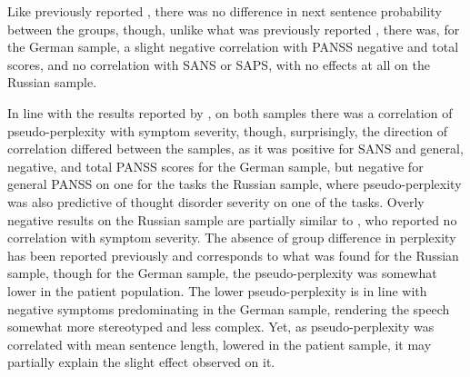
Like previously reported \citep{hitczenko2021understanding, tang2021natural}, there was no difference in next sentence probability between the groups, though, unlike what was previously reported \citep{tang2021natural, jeong2023exploring}, there was, for the German sample, a slight negative correlation with PANSS negative and total scores, and no correlation with SANS or SAPS, with no effects at all on the Russian sample.



In line with the results reported by \citet{vail2018toward}, on both samples there was a correlation of pseudo-perplexity with symptom severity, though, surprisingly, the direction of correlation differed between the samples, as it was positive for SANS and general, negative, and total PANSS scores for the German sample, but negative for general PANSS on one for the tasks the Russian sample, where pseudo-perplexity was also predictive of thought disorder severity on one of the tasks. Overly negative results on the Russian sample are partially similar to \citet{girard2022computational}, who reported no correlation with symptom severity. The absence of group difference in perplexity has been reported previously \citep{mitchell2015quantifying} and corresponds to what was found for the Russian sample, though for the German sample, the pseudo-perplexity was somewhat lower in the patient population. The lower pseudo-perplexity is in line with negative symptoms predominating in the German sample, rendering the speech somewhat more stereotyped and less complex. Yet, as pseudo-perplexity was correlated with mean sentence length, lowered in the patient sample, it may partially explain the slight effect observed on it.

